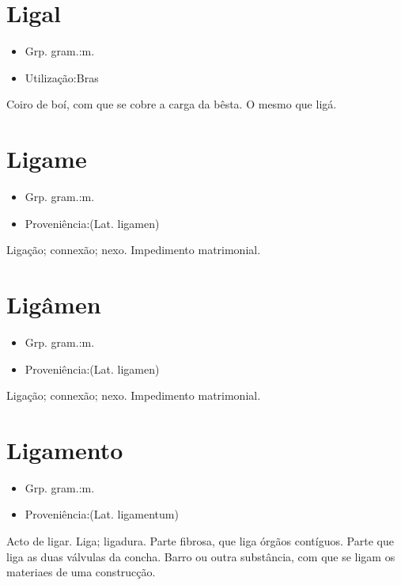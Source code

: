 \section{Ligal}
\begin{itemize}
\item {Grp. gram.:m.}
\end{itemize}
\begin{itemize}
\item {Utilização:Bras}
\end{itemize}
Coiro de boí, com que se cobre a carga da bêsta.
O mesmo que \textunderscore ligá\textunderscore .
\section{Ligame}
\begin{itemize}
\item {Grp. gram.:m.}
\end{itemize}
\begin{itemize}
\item {Proveniência:(Lat. \textunderscore ligamen\textunderscore )}
\end{itemize}
Ligação; connexão; nexo.
Impedimento matrimonial.
\section{Ligâmen}
\begin{itemize}
\item {Grp. gram.:m.}
\end{itemize}
\begin{itemize}
\item {Proveniência:(Lat. \textunderscore ligamen\textunderscore )}
\end{itemize}
Ligação; connexão; nexo.
Impedimento matrimonial.
\section{Ligamento}
\begin{itemize}
\item {Grp. gram.:m.}
\end{itemize}
\begin{itemize}
\item {Proveniência:(Lat. \textunderscore ligamentum\textunderscore )}
\end{itemize}
Acto de ligar.
Liga; ligadura.
Parte fibrosa, que liga órgãos contíguos.
Parte que liga as duas válvulas da concha.
Barro ou outra substância, com que se ligam os materiaes de uma construcção.

